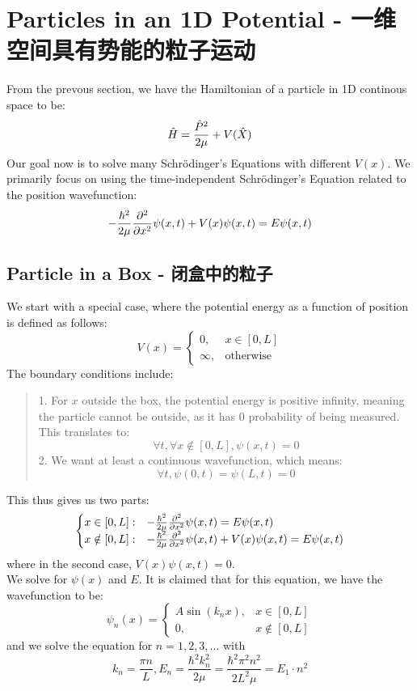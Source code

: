 \section{Particles in an 1D Potential - 一维空间具有势能的粒子运动}
From the prevous section, we have the Hamiltonian of a particle in 1D continous space to be:
$$\hat{H} = \frac{\hat{P}^2}{2\mu} + V(\hat{X})$$
Our goal now is to solve many Schr\"odinger's Equations with different $V(x)$. We primarily focus on using the time-independent Schr\"odinger's Equation related to the position wavefunction:
$$-\frac{\hbar^2}{2\mu}\pdv[2]{x} \psi(x, t) + V(x)\psi(x, t) = E \psi(x, t)$$

\subsection{Particle in a Box - 闭盒中的粒子}
We start with a special case, where the potential energy as a function of position is defined as follows:
$$V(x) = \begin{cases}
    0, & x \in [0, L] \\
    \infty, & \text{otherwise}
\end{cases}$$
The boundary conditions include:
\begin{quote}
    1. For $x$ outside the box, the potential energy is positive infinity, meaning the particle cannot be outside, as it has $0$ probability of being measured. This translates to:
    $$\forall t, \forall x \notin [0, L], \psi(x, t) = 0$$
    2. We want at least a continuous wavefunction, which means:
    $$\forall t, \psi(0, t) = \psi(L, t) = 0$$
\end{quote}
This thus gives us two parts:
$$\begin{cases}
    x \in [0, L]: & -\frac{\hbar^2}{2\mu}\pdv[2]{x} \psi(x, t) = E \psi(x, t) \\
    x \notin [0, L]: & -\frac{\hbar^2}{2\mu}\pdv[2]{x} \psi(x, t) + V(x)\psi(x, t) = E \psi(x, t)
\end{cases}$$
where in the second case, $V(x)\psi(x, t) = 0$. \\
We solve for $\psi(x)$ and $E$. It is claimed that for this equation, we have the wavefunction to be:
$$\psi_n(x) = \begin{cases}
    A\sin(k_n x), & x \in [0, L] \\
    0, & x \notin [0, L]
\end{cases}$$
and we solve the equation for $n = 1, 2, 3, \dots$ with
$$k_n = \frac{\pi n}{L}, E_n = \frac{\hbar^2 k_n^2}{2\mu} = \frac{\hbar^2 \pi^2 n^2}{2L^2 \mu} = E_1 \cdot n^2$$
